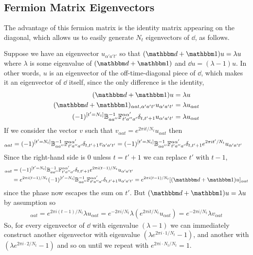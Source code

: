 \subsection{Fermion Matrix Eigenvectors}

The advantage of this fermion matrix is the identity matrix appearing on the diagonal, which allows us to easily generate $N_t$ eigenvectors of $\dd$, as follows.

Suppose we have an eigenvector $u_{\alpha' a' t'}$ so that $(\dd+\one)u = \lambda u$ where $\lambda$ is some eigenvalue of $(\dd+\one)$ and $\dd u = (\lambda-1) u$.
In other words, $u$ is an eigenvector of the off-time-diagonal piece of $\dd$, which makes it an eigenvector of $\dd$ itself, since the only difference is the identity,
\begin{align}
    (\dd+\one)u &= \lambda u
    \nonumber\\
    (\dd+\one)_{\alpha a t, \alpha' a' t'}u_{\alpha' a' t'} &= \lambda u_{\alpha a t}
    \nonumber\\
	(-1)^{[t'=N_t]} \BB\inverse_{aa''}\FF_{t' a''a'}^{\alpha\alpha'} \delta_{t,t'+1} u_{\alpha' a' t'} &= \lambda u_{\alpha a t}
\end{align}
If we consider the vector $v$ such that $v_{\alpha a t} = e^{2\pi i t/N_t} u_{\alpha a t}$ then
\begin{align}
    [(\dd+\one)v]_{\alpha a t} = 
	(-1)^{[t'=N_t]} \BB\inverse_{aa''}\FF_{t' a''a'}^{\alpha\alpha'} \delta_{t,t'+1} v_{\alpha' a' t'} &=
	(-1)^{[t'=N_t]} \BB\inverse_{aa''}\FF_{t' a''a'}^{\alpha\alpha'} \delta_{t,t'+1} e^{2\pi i t' /N_t} u_{\alpha' a' t'} 
\end{align}
Since the right-hand side is 0 unless $t=t'+1$ we can replace $t'$ with $t-1$,
\begin{align}
    [(\dd+\one)v]_{\alpha a t}
    &=
	(-1)^{[t'=N_t]} \BB\inverse_{aa''}\FF_{t' a''a'}^{\alpha\alpha'} \delta_{t,t'+1} e^{2\pi i (t-1) /N_t} u_{\alpha' a' t'} 
    \nonumber\\
    &=
	e^{2\pi i (t-1) /N_t} (-1)^{[t'=N_t]} \BB\inverse_{aa''}\FF_{t' a''a'}^{\alpha\alpha'} \delta_{t,t'+1} u_{\alpha' a' t'} 
    =
    e^{2\pi i (t-1) /N_t} [(\dd+\one)u]_{\alpha a t}
\end{align}
since the phase now escapes the sum on $t'$.
But $(\dd+\one)u = \lambda u$ by assumption so
\begin{align}
    [(\dd+\one)v]_{\alpha a t}
    =
    e^{2\pi i (t-1) /N_t} \lambda u_{\alpha a t}
    =
	e^{-2\pi i /N_t} \lambda \left(e^{2\pi i t / N_t} u_{\alpha a t}\right)
    =
    e^{-2\pi i /N_t} \lambda v_{\alpha a t}
\end{align}
So, for every eigenvector of $\dd$ with eigenvalue $(\lambda-1)$ we can immediately construct another eigenvector with eigenvalue $(\lambda e^{2\pi i \cdot 1/N_t}-1)$, and another with $(\lambda e^{2\pi i\cdot 2/N_t}-1)$ and so on until we repeat with $e^{2\pi i \cdot N_t/N_t}=1$.

